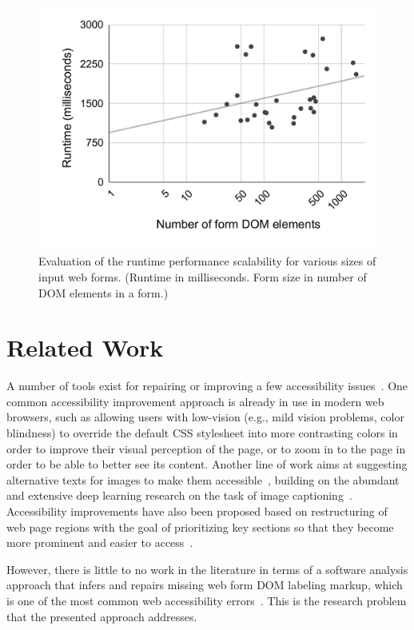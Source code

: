 \begin{figure}
	\centering
	\includegraphics[width=0.7\linewidth,trim={8mm 12mm 8mm 8mm},clip]{accessibility_repair/figures/rq3chart.pdf}
	\caption{Evaluation of the runtime performance scalability for various sizes 
		of input web forms. (Runtime in milliseconds. Form size in number of DOM elements in a form.)}
	\label{fig:rq3}
\end{figure}

\section{Related Work}
A number of tools exist for repairing or improving a few accessibility 
issues~\cite{yesilada2019web, asakawa2019transcoding}. 
One common accessibility improvement approach is already 
in use in modern web browsers, 
such as allowing users with low-vision (e.g., mild vision problems, 
color blindness) to override the default CSS stylesheet into more 
contrasting colors in order to improve their visual perception of 
the page, or to zoom in to the page in order to be able to better 
see its content. Another line of work aims at suggesting alternative 
texts for images to make them accessible~\cite{mack2021designing, 
wu2017automatic, bigham2006webinsight}, building on the abundant 
and extensive deep learning research on the task of image 
captioning~\cite{hossain2019comprehensive}. Accessibility improvements 
have also been proposed based on restructuring of web page regions with 
the goal of prioritizing key sections so that they become more prominent 
and easier to access~\cite{akpinar2015old}.

However, there is little to no work in the literature in terms of a 
software analysis approach that infers and repairs missing web form 
DOM labeling markup, which is one of the most common web accessibility 
errors~\cite{webaim:1mil}. This is the research problem that the presented approach addresses. 


